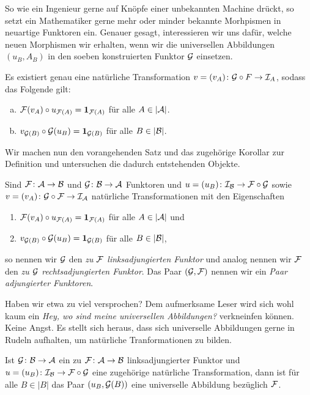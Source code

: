 So wie ein Ingenieur gerne auf Knöpfe einer unbekannten Machine drückt, so setzt ein Mathematiker gerne mehr oder minder bekannte Morhpismen in neuartige Funktoren ein. Genauer gesagt, interessieren wir uns dafür, welche neuen Morphismen wir erhalten, wenn wir die universellen Abbildungen $(u_B, A_B)$ in den soeben konstruierten Funktor $\mathcal{G}$ einsetzen.

\begin{kor}
  Es existiert genau eine natürliche Transformation $v = (v_A) \colon \mathcal{G} \circ F \to \mathcal{I}_A$, sodass das Folgende gilt:
  \begin{enumerate}[(a)]
    \item $\mathcal{F}(v_A) \circ u_{\mathcal{F}(A)} = \mathbf{1}_{\mathcal{F}(A)}$ für alle $A \in |\mathcal{A}|$.
    \item $v_{\mathcal{G}(B)} \circ \mathcal{G}(u_B) = \mathbf{1}_{\mathcal{G}(B)}$ für alle $B \in |\mathcal{B}|$.
  \end{enumerate}
\end{kor}

Wir machen nun den vorangehenden Satz und das zugehörige Korollar zur Definition und untersuchen die dadurch entstehenden Objekte.

\begin{defn}
  Sind $\mathcal{F} \colon \mathcal{A} \to \mathcal{B}$ und $\mathcal{G} \colon \mathcal{B} \to \mathcal{A}$ Funktoren und $u = (u_B) \colon \mathcal{I}_{\mathcal{B}} \to \mathcal{F} \circ \mathcal{G}$ sowie $v = (v_A) \colon \mathcal{G} \circ \mathcal{F} \to \mathcal{I}_{\mathcal{A}}$ natürliche Transformationen mit den Eigenschaften
  \begin{enumerate}[(1)]
    \item $\mathcal{F}(v_A) \circ u_{\mathcal{F}(A)} = \mathbf{1}_{\mathcal{F}(A)}$ für alle $A \in |\mathcal{A}|$ und
    \item $v_{\mathcal{G}(B)} \circ \mathcal{G}(u_B) = \mathbf{1}_{\mathcal{G}(B)}$ für alle $B \in |\mathcal{B}|$,
  \end{enumerate}
  so nennen wir $\mathcal{G}$ den \emph{zu $\mathcal{F}$ linksadjungierten Funktor} und analog nennen wir $\mathcal{F}$ den \emph{zu $\mathcal{G}$ rechtsadjungierten Funktor}.
  Das Paar $(\mathcal{G}, \mathcal{F})$ nennen wir ein \emph{Paar adjungierter Funktoren}.
\end{defn}

Haben wir etwa zu viel versprochen?
Dem aufmerksame Leser wird sich wohl kaum ein \emph{Hey, wo sind meine universellen Abbildungen?} verkneinfen können.
Keine Angst.
Es stellt sich heraus, dass sich universelle Abbildungen gerne in Rudeln aufhalten, um natürliche Tranformationen zu bilden.

\begin{thm}
  Ist $\mathcal{G} \colon \mathcal{B} \to \mathcal{A}$ ein zu $\mathcal{F} \colon \mathcal{A} \to \mathcal{B}$ linksadjungierter Funktor und $u = (u_B) \colon \mathcal{I}_{\mathcal{B}} \to \mathcal{F} \circ \mathcal{G}$ eine zugehörige natürliche Transformation, dann ist für alle $B \in |B|$ das Paar $(u_B, \mathcal{G}(B))$ eine universelle Abbildung bezüglich $\mathcal{F}$.
\end{thm}


